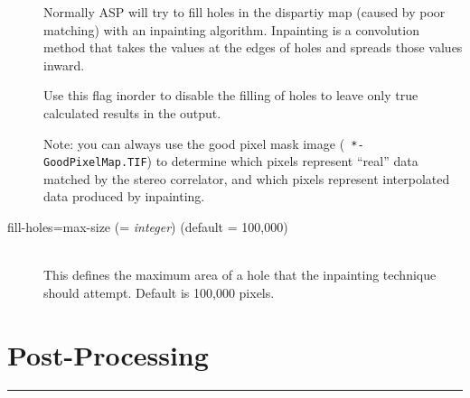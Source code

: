 \begin{description}
  Normally ASP will try to fill holes in the dispartiy map (caused by
  poor matching) with an inpainting algorithm. Inpainting is a
  convolution method that takes the values at the edges of holes and
  spreads those values inward.

  Use this flag inorder to disable the filling of holes to leave only
  true calculated results in the output.

  Note: you can always use the good pixel mask image ({\tt
    *-GoodPixelMap.TIF}) to determine which pixels represent ``real''
  data matched by the stereo correlator, and which pixels represent
  interpolated data produced by inpainting.

\item[fill-holes=max-size \textnormal{\small{(= \emph{integer})}} (default = 100,000)] \hfill \\
  This defines the maximum area of a hole that the inpainting
  technique should attempt. Default is 100,000 pixels.

\end{description}


\section{Post-Processing}
\hrule
\bigskip

